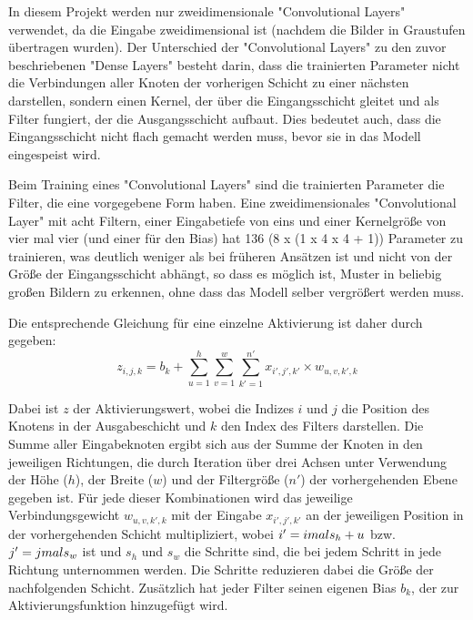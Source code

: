 In diesem Projekt werden nur zweidimensionale "Convolutional Layers" verwendet, da die Eingabe zweidimensional ist (nachdem die Bilder in Graustufen übertragen wurden).
Der Unterschied der "Convolutional Layers" zu den zuvor beschriebenen "Dense Layers" besteht darin, dass die trainierten Parameter nicht die Verbindungen aller Knoten der vorherigen Schicht zu einer nächsten darstellen, sondern einen Kernel, der über die Eingangsschicht gleitet und als Filter fungiert, der die Ausgangsschicht aufbaut.
Dies bedeutet auch, dass die Eingangsschicht nicht flach gemacht werden muss, bevor sie in das Modell eingespeist wird.

Beim Training eines "Convolutional Layers" sind die trainierten Parameter die Filter, die eine vorgegebene Form haben.
Eine zweidimensionales "Convolutional Layer" mit acht Filtern, einer Eingabetiefe von eins und einer Kernelgröße von vier mal vier (und einer für den Bias) hat 136 (8 x (1 x 4 x 4 + 1)) Parameter zu trainieren, was deutlich weniger als bei früheren Ansätzen ist und nicht von der Größe der Eingangsschicht abhängt, so dass es möglich ist, Muster in beliebig großen Bildern zu erkennen, ohne dass das Modell selber vergrößert werden muss.

Die entsprechende Gleichung für eine einzelne Aktivierung ist daher durch \cite[S. 453]{Geron2019} gegeben:
\begin{equation}
    z_{i,j,k} = b_k + \sum_{u=1}^{h} \sum_{v=1}^{w} \sum_{k'=1}^{n'} x_{i', j', k'} \times w_{u, v, k', k} 
\end{equation}

Dabei ist $z$ der Aktivierungswert, wobei die Indizes $i$ und $j$ die Position des Knotens in der Ausgabeschicht und $k$ den Index des Filters darstellen.
Die Summe aller Eingabeknoten ergibt sich aus der Summe der Knoten in den jeweiligen Richtungen, die durch Iteration über drei Achsen unter Verwendung der Höhe ($h$), der Breite ($w$) und der Filtergröße ($n'$) der vorhergehenden Ebene gegeben ist.
Für jede dieser Kombinationen wird das jeweilige Verbindungsgewicht $w_{u, v, k', k}$ mit der Eingabe $x_{i', j', k'}$ an der jeweiligen Position in der vorhergehenden Schicht multipliziert, wobei $i' = i \-mal s_h + u$ bzw. $j' = j \-mal s_w$ ist und $s_h$ und $s_w$ die Schritte sind, die bei jedem Schritt in jede Richtung unternommen werden. Die Schritte reduzieren dabei die Größe der nachfolgenden Schicht.
Zusätzlich hat jeder Filter seinen eigenen Bias $b_k$, der zur Aktivierungsfunktion hinzugefügt wird.


